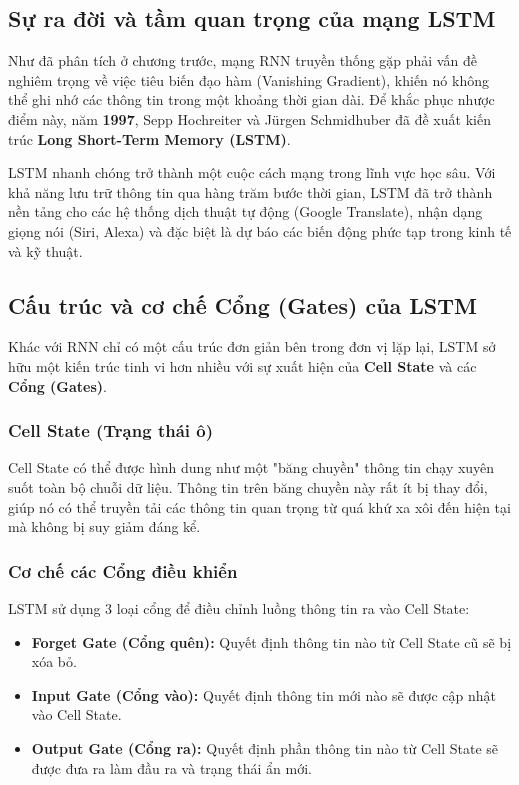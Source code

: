 \subsection{Sự ra đời và tầm quan trọng của mạng LSTM}
Như đã phân tích ở chương trước, mạng RNN truyền thống gặp phải vấn đề nghiêm trọng về việc tiêu biến đạo hàm (Vanishing Gradient), khiến nó không thể ghi nhớ các thông tin trong một khoảng thời gian dài. Để khắc phục nhược điểm này, năm \textbf{1997}, Sepp Hochreiter và Jürgen Schmidhuber đã đề xuất kiến trúc \textbf{Long Short-Term Memory (LSTM)}. 

LSTM nhanh chóng trở thành một cuộc cách mạng trong lĩnh vực học sâu. Với khả năng lưu trữ thông tin qua hàng trăm bước thời gian, LSTM đã trở thành nền tảng cho các hệ thống dịch thuật tự động (Google Translate), nhận dạng giọng nói (Siri, Alexa) và đặc biệt là dự báo các biến động phức tạp trong kinh tế và kỹ thuật.

\subsection{Cấu trúc và cơ chế Cổng (Gates) của LSTM}
Khác với RNN chỉ có một cấu trúc đơn giản bên trong đơn vị lặp lại, LSTM sở hữu một kiến trúc tinh vi hơn nhiều với sự xuất hiện của \textbf{Cell State} và các \textbf{Cổng (Gates)}.

\subsubsection{Cell State (Trạng thái ô)}
Cell State có thể được hình dung như một "băng chuyền" thông tin chạy xuyên suốt toàn bộ chuỗi dữ liệu. Thông tin trên băng chuyền này rất ít bị thay đổi, giúp nó có thể truyền tải các thông tin quan trọng từ quá khứ xa xôi đến hiện tại mà không bị suy giảm đáng kể.

\subsubsection{Cơ chế các Cổng điều khiển}
LSTM sử dụng 3 loại cổng để điều chỉnh luồng thông tin ra vào Cell State:
\begin{itemize}
    \item \textbf{Forget Gate (Cổng quên):} Quyết định thông tin nào từ Cell State cũ sẽ bị xóa bỏ.
    \item \textbf{Input Gate (Cổng vào):} Quyết định thông tin mới nào sẽ được cập nhật vào Cell State.
    \item \textbf{Output Gate (Cổng ra):} Quyết định phần thông tin nào từ Cell State sẽ được đưa ra làm đầu ra và trạng thái ẩn mới.
\end{itemize}

